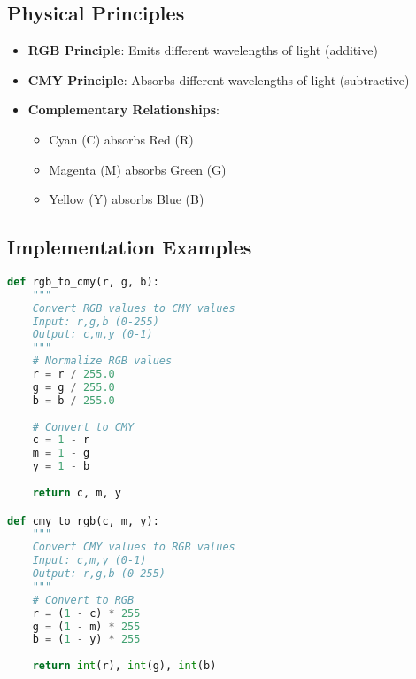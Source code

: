 \documentclass[12pt]{article}
\begin{document}
\subsection{Physical Principles}
\begin{itemize}
    \item \textbf{RGB Principle}: Emits different wavelengths of light (additive)
    \item \textbf{CMY Principle}: Absorbs different wavelengths of light (subtractive)
    \item \textbf{Complementary Relationships}:
        \begin{itemize}
            \item Cyan (C) absorbs Red (R)
            \item Magenta (M) absorbs Green (G)
            \item Yellow (Y) absorbs Blue (B)
        \end{itemize}
\end{itemize}

\subsection{Implementation Examples}
\begin{lstlisting}[language=python, caption=Color Space Conversion Implementation]
def rgb_to_cmy(r, g, b):
    """
    Convert RGB values to CMY values
    Input: r,g,b (0-255)
    Output: c,m,y (0-1)
    """
    # Normalize RGB values
    r = r / 255.0
    g = g / 255.0
    b = b / 255.0
    
    # Convert to CMY
    c = 1 - r
    m = 1 - g
    y = 1 - b
    
    return c, m, y

def cmy_to_rgb(c, m, y):
    """
    Convert CMY values to RGB values
    Input: c,m,y (0-1)
    Output: r,g,b (0-255)
    """
    # Convert to RGB
    r = (1 - c) * 255
    g = (1 - m) * 255
    b = (1 - y) * 255
    
    return int(r), int(g), int(b)
\end{lstlisting}
\end{document}
